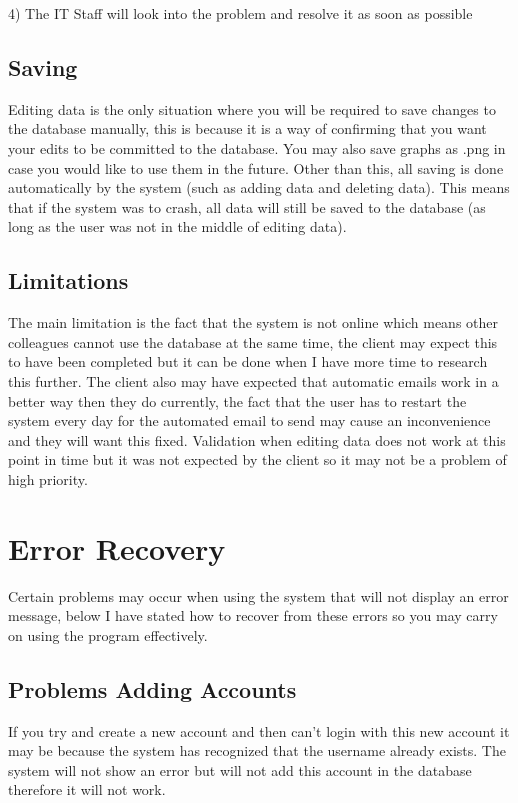 4) The IT Staff will look into the problem and resolve it as soon as possible

\subsection{Saving}

Editing data is the only situation where you will be required to save changes to the database manually, this is because it is a way of confirming that you want your edits to be committed to the database. You may also save graphs as .png in case you would like to use them in the future. Other than this, all saving is done automatically by the system (such as adding data and deleting data). This means that if the system was to crash, all data will still be saved to the database (as long as the user was not in the middle of editing data).

\subsection{Limitations}

The main limitation is the fact that the system is not online which means other colleagues cannot use the database at the same time, the client may expect this to have been completed but it can be done when I have more time to research this further. The client also may have expected that automatic emails work in a better way then they do currently, the fact that the user has to restart the system every day for the automated email to send may cause an inconvenience and they will want this fixed. Validation when editing data does not work at this point in time but it was not expected by the client so it may not be a problem of high priority.

\section{Error Recovery}

Certain problems may occur when using the system that will not display an error message, below I have stated how to recover from these errors so you may carry on using the program effectively. 

\subsection{Problems Adding Accounts}

If you try and create a new account and then can't login with this new account it may be because the system has recognized that the username already exists. The system will not show an error but will not add this account in the database therefore it will not work. \newline

